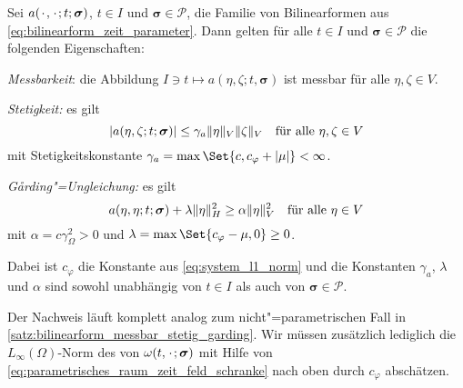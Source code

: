 \begin{Satz}
\label{satz:parametrische_bilinearform_messbar_stetig_garding}
    Sei $a({\mkern2mu\cdot\mkern2mu}, {\mkern2mu\cdot\mkern2mu}; t; \bm\sigma)$, $t \in I$ und $\bm\sigma \in \mathcal P$, die Familie von Bilinearformen aus \cref{eq:bilinearform_zeit_parameter}.
    Dann gelten für alle $t \in I$ und $\bm\sigma \in \mathcal P$ die folgenden Eigenschaften:
    \begin{thmenumerate}
        \item\label{satz:parametrische_bilinearform_messbar_stetig_garding:messbar}
        \emph{Messbarkeit}: die Abbildung $I \ni t \mapsto a(\eta, \zeta; t, \bm\sigma)$ ist messbar für alle $\eta, \zeta \in V$.
        \item\label{satz:parametrische_bilinearform_messbar_stetig_garding:stetig}
        \emph{Stetigkeit:} es gilt
        \begin{equation}
            \label{eq:parametrische_bilinearform_messbar_stetig_garding:stetig}
            \lvert a(\eta, \zeta; t; \bm\sigma)\rvert \leq \gamma_{a} \lVert\eta\rVert_{V} \lVert\zeta\rVert_{V} \quad \text{für alle}~\eta, \zeta \in V
        \end{equation}
        mit Stetigkeitskonstante $\gamma_{a} = \max\Set{c, c_{\varphi} + \abs{\mu}} < \infty$.
        \item\label{satz:parametrische_bilinearform_messbar_stetig_garding:garding}
        \emph{G\aa{}rding"=Ungleichung:} es gilt
        \begin{equation}
            \label{eq:parametrische_bilinearform_messbar_stetig_garding:garding}
            a(\eta, \eta; t; \bm\sigma) + \lambda \lVert\eta\rVert_{H}^{2} \geq \alpha \lVert\eta\rVert_{V}^{2} \quad \text{für alle}~\eta \in V
        \end{equation}
        mit $\alpha = c \gamma_{\Omega}^{2} > 0$ und $\lambda = \max\Set{c_{\varphi} - \mu, 0} \geq 0$.
    \end{thmenumerate}
    Dabei ist $c_{\varphi}$ die Konstante aus \cref{eq:system_l1_norm} und die Konstanten $\gamma_{a}$, $\lambda$ und $\alpha$ sind sowohl unabhängig von $t \in I$ als auch von $\bm\sigma \in \mathcal P$.

    \begin{Beweis}
        Der Nachweis läuft komplett analog zum nicht"=parametrischen Fall in \cref{satz:bilinearform_messbar_stetig_garding}.
        Wir müssen zusätzlich lediglich die $L_{\infty}(\Omega)$-Norm des von $\omega(t, {\mkern2mu\cdot\mkern2mu}; \bm\sigma)$ mit Hilfe von \cref{eq:parametrisches_raum_zeit_feld_schranke} nach oben durch $c_{\varphi}$ abschätzen.
    \end{Beweis}
\end{Satz}

